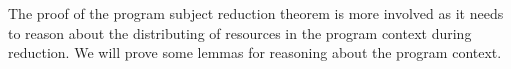The proof of the program subject reduction theorem is more involved as it needs to
reason about the distributing of resources in the program context during reduction.
We will prove some lemmas for reasoning about the program context.






